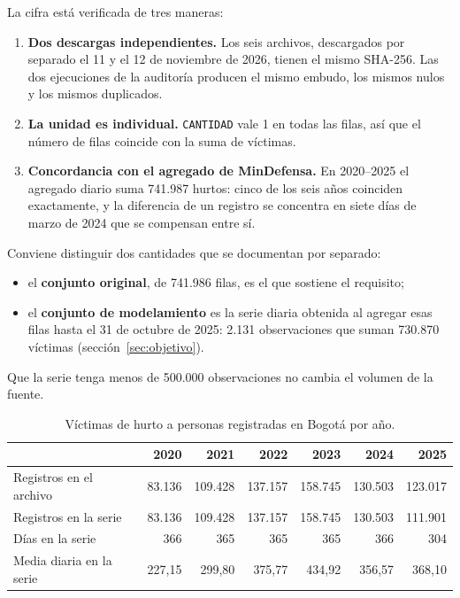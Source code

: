 La cifra está verificada de tres maneras:
\begin{enumerate}
  \item \textbf{Dos descargas independientes.} Los seis archivos, descargados por separado el 11 y el 12 de noviembre de 2026, tienen el mismo SHA-256. Las dos ejecuciones de la auditoría producen el mismo embudo, los mismos nulos y los mismos duplicados.
  \item \textbf{La unidad es individual.} \texttt{CANTIDAD} vale 1 en todas las filas, así que el número de filas coincide con la suma de víctimas.
  \item \textbf{Concordancia con el agregado de MinDefensa.} En 2020--2025 el agregado diario suma 741.987 hurtos: cinco de los seis años coinciden exactamente, y la diferencia de un registro se concentra en siete días de marzo de 2024 que se compensan entre sí.
\end{enumerate}

Conviene distinguir dos cantidades que se documentan por separado:
\begin{itemize}
  \item el \textbf{conjunto original}, de 741.986 filas, es el que sostiene el requisito;
  \item el \textbf{conjunto de modelamiento} es la serie diaria obtenida al agregar esas filas hasta el 31 de octubre de 2025: 2.131 observaciones que suman 730.870 víctimas (sección~\ref{sec:objetivo}).
\end{itemize}
Que la serie tenga menos de 500.000 observaciones no cambia el volumen de la fuente.

\begin{table}[H]
\centering
\caption{Víctimas de hurto a personas registradas en Bogotá por año.}\label{tab:anual}
\begin{tabular}{@{}lrrrrrr@{}}
\toprule
 & \textbf{2020} & \textbf{2021} & \textbf{2022} & \textbf{2023} & \textbf{2024} & \textbf{2025} \\
\midrule
Registros en el archivo & 83.136 & 109.428 & 137.157 & 158.745 & 130.503 & 123.017 \\
Registros en la serie & 83.136 & 109.428 & 137.157 & 158.745 & 130.503 & 111.901 \\
Días en la serie & 366 & 365 & 365 & 365 & 366 & 304 \\
Media diaria en la serie & 227,15 & 299,80 & 375,77 & 434,92 & 356,57 & 368,10 \\
\bottomrule
\end{tabular}
\end{table}

